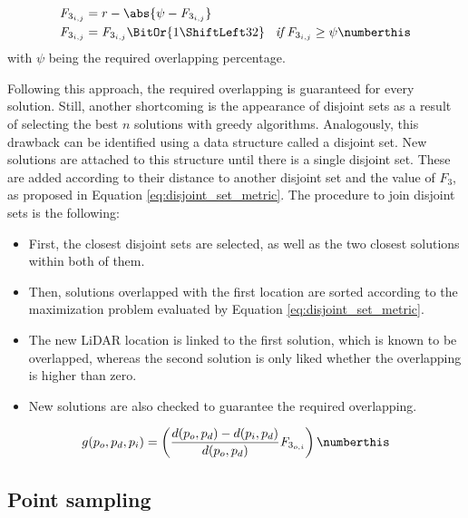 \begin{align*}
    \textit{F}_{3_{i, j}} &= r - \abs{\psi - \textit{F}_{3_{i, j}}}\\
    \textit{F}_{3_{i, j}} &= \textit{F}_{3_{i, j}} \BitOr{1 \ShiftLeft 32} \hspace{3mm} \textit{if} \hspace{1mm}  \textit{F}_{3_{i, j}} \geq \psi
    \numberthis \label{eq:loo}
\end{align*}
with $\psi$ being the required overlapping percentage.

Following this approach, the required overlapping is guaranteed for every solution. Still, another shortcoming is the appearance of disjoint sets as a result of selecting the best $n$ solutions with greedy algorithms. Analogously, this drawback can be identified using a data structure called a disjoint set. New solutions are attached to this structure until there is a single disjoint set. These are added according to their distance to another disjoint set and the value of $F_3$, as proposed in Equation \ref{eq:disjoint_set_metric}. The procedure to join disjoint sets is the following:
\begin{itemize}
    \item First, the closest disjoint sets are selected, as well as the two closest solutions within both of them.
    \item Then, solutions overlapped with the first location are sorted according to the maximization problem evaluated by Equation \ref{eq:disjoint_set_metric}. 
    \item The new LiDAR location is linked to the first solution, which is known to be overlapped, whereas the second solution is only liked whether the overlapping is higher than zero. 
    \item New solutions are also checked to guarantee the required overlapping.
\end{itemize}
\begin{align*}
    g(p_o, p_d, p_i) = \left(\frac{d(p_o, p_d) - d(p_i, p_d)}{d(p_o, p_d)} \textit{F}_{3_{o, i}}\right)
    \numberthis \label{eq:disjoint_set_metric}
\end{align*}

\subsection{Point sampling}

